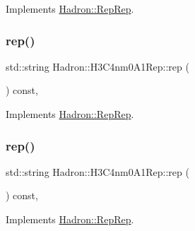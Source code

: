 Implements \mbox{\hyperlink{structHadron_1_1RepRep_ab3213025f6de249f7095892109575fde}{Hadron\+::\+Rep\+Rep}}.

\mbox{\label{structHadron_1_1H3C4nm0A1Rep_a3634b28d2dcd2a2aab44846494b1f39c}} 
\subsubsection{\texorpdfstring{rep()}{rep()}\hspace{0.1cm}{\footnotesize\ttfamily [2/5]}}
{\footnotesize\ttfamily std\+::string Hadron\+::\+H3\+C4nm0\+A1\+Rep\+::rep (\begin{DoxyParamCaption}{ }\end{DoxyParamCaption}) const\hspace{0.3cm}{\ttfamily [inline]}, {\ttfamily [virtual]}}



Implements \mbox{\hyperlink{structHadron_1_1RepRep_ab3213025f6de249f7095892109575fde}{Hadron\+::\+Rep\+Rep}}.

\mbox{\label{structHadron_1_1H3C4nm0A1Rep_a3634b28d2dcd2a2aab44846494b1f39c}} 
\subsubsection{\texorpdfstring{rep()}{rep()}\hspace{0.1cm}{\footnotesize\ttfamily [3/5]}}
{\footnotesize\ttfamily std\+::string Hadron\+::\+H3\+C4nm0\+A1\+Rep\+::rep (\begin{DoxyParamCaption}{ }\end{DoxyParamCaption}) const\hspace{0.3cm}{\ttfamily [inline]}, {\ttfamily [virtual]}}



Implements \mbox{\hyperlink{structHadron_1_1RepRep_ab3213025f6de249f7095892109575fde}{Hadron\+::\+Rep\+Rep}}.

\mbox{\label{structHadron_1_1H3C4nm0A1Rep_a3634b28d2dcd2a2aab44846494b1f39c}} 
